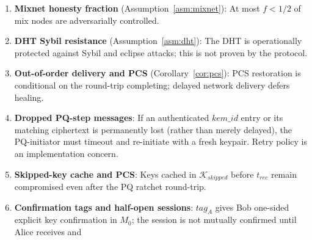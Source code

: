 \documentclass[11pt,a4paper]{article}
\theoremstyle{remark}
\theoremstyle{plain}
\begin{document}
\begin{enumerate}
        against active tampering.  This assumption requires the identity key to reside in a hardware-isolated environment
        (HSM, secure enclave, or protected keystore) inaccessible to the Corrupt oracle.  (In contrast, against a
        passive-after-compromise adversary who only eavesdrops post-compromise, recovery does not depend on identity key isolation,
        but still fundamentally depends on ML-KEM-768 IND-CCA2 security, post-$t_{\mathrm{rec}}$ RNG integrity, and deletion
        schedule enforcement; it is not ``unconditional''.)
        The ratchet's PCS addresses a distinct threat from what the identity key alone provides:
        static identity keys supply authentication, whereas the ratchet continuously refreshes quantum-resistant
        symmetric confidentiality, using the hardware-isolated signing key strictly to prevent active
        ciphertext substitution during healing.  A reviewer asking ``why does the ratchet add anything beyond
        the identity key?'' should read Section~\ref{sec:secmodel}: the EUF-CMA term in Theorem~\ref{thm:single-update-pcs}
        is a guard against active substitution, not the primary confidentiality mechanism; ML-KEM IND-CCA2
        provides the confidentiality recovery.
  \item \textbf{Mixnet honesty fraction} (Assumption~\ref{asm:mixnet}): At most $f < 1/2$ of
        mix nodes are adversarially controlled.
  \item \textbf{DHT Sybil resistance} (Assumption~\ref{asm:dht}): The DHT is operationally
        protected against Sybil and eclipse attacks; this is not proven by the protocol.
  \item \textbf{Out-of-order delivery and PCS} (Corollary~\ref{cor:pcs}): PCS restoration is
        conditional on the round-trip completing; delayed network delivery defers healing.
  \item \textbf{Dropped PQ-step messages}: If an authenticated $kem\_id$ entry or its matching
        ciphertext is
        permanently lost (rather than merely delayed), the PQ-initiator must timeout and
        re-initiate with a fresh keypair.  Retry policy is an implementation concern.
  \item \textbf{Skipped-key cache and PCS}: Keys cached in $\mathcal{K}_{skipped}$ before
        $t_{rec}$ remain compromised even after the PQ ratchet round-trip.
  \item \textbf{Confirmation tags and half-open sessions}: $tag_A$ gives Bob one-sided explicit
        key confirmation in $M_0$; the session is not mutually confirmed until Alice receives and

\end{enumerate}
\end{document}
